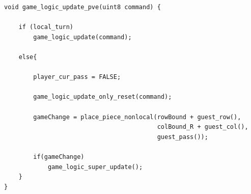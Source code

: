 \documentclass[a4paper, 12pt]{article}
\begin{document}
    \begin{verbatim}
void game_logic_update_pve(uint8 command) {
    
    if (local_turn)
        game_logic_update(command);
    
    else{
        
        player_cur_pass = FALSE; 
        
        game_logic_update_only_reset(command);
        
        gameChange = place_piece_nonlocal(rowBound + guest_row(), 
                                          colBound_R + guest_col(), 
                                          guest_pass());
        
        if(gameChange)
            game_logic_super_update();
    }
}
    \end{verbatim}
\end{document}
